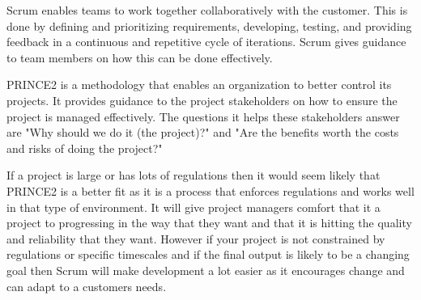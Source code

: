 \documentclass{article}
\begin{document}
Scrum enables teams to work together collaboratively with the customer. This is done by defining and prioritizing requirements, developing, testing, and providing feedback in a continuous and repetitive cycle of iterations. Scrum gives guidance to team members on how this can be done effectively.

PRINCE2 is a methodology that enables an organization to better control its projects. It provides guidance to the project stakeholders on how to ensure the project is managed effectively. The questions it helps these stakeholders answer are "Why should we do it (the project)?" and "Are the benefits worth the costs and risks of doing the project?"

If a project is large or has lots of regulations then it would seem likely that PRINCE2 is a better fit as it is a process that enforces regulations and works well in that type of environment. It will give project managers comfort that it a project to progressing in the way that they want and that it is hitting the quality and reliability that they want.
However if your project is not constrained by regulations or specific timescales and if the final output is likely to be a changing goal then Scrum will make development a lot easier as it encourages change and can adapt to a customers needs.


\end{document}

